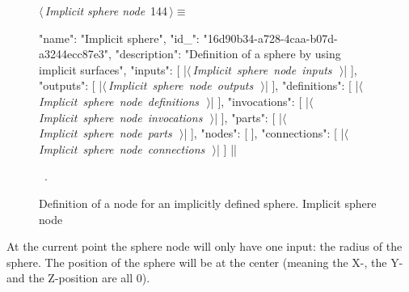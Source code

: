 \documentclass[%
    a4paper,    %
    justified,  %
    nobib,      %
    openany     %
]{tufte-book}
\makeatletter
\renewcommand{\label}[1]{\@tufte@label{##1}}%
\makeatother
\begin{document}
\begin{figure}[!htbp]
\begin{flushleft} \small
\begin{minipage}{\linewidth}\label{scrap98}\raggedright\small
{} $\langle\,${\itshape Implicit sphere node}\nobreak\ {\footnotesize {144}}$\,\rangle\equiv$
\vspace{-1ex}
\begin{pythoncode}
{
    "name": "Implicit sphere",
    "id_": "16d90b34-a728-4caa-b07d-a3244ecc87e3",
    "description": "Definition of a sphere by using implicit surfaces",
    "inputs": [
        |\hbox{$\langle\,${\itshape Implicit sphere node inputs}\nobreak\ {\footnotesize {}}$\,\rangle$}|
    ],
    "outputs": [
        |\hbox{$\langle\,${\itshape Implicit sphere node outputs}\nobreak\ {\footnotesize {}}$\,\rangle$}|
    ],
    "definitions": [
        |\hbox{$\langle\,${\itshape Implicit sphere node definitions}\nobreak\ {\footnotesize {}}$\,\rangle$}|
    ],
    "invocations": [
        |\hbox{$\langle\,${\itshape Implicit sphere node invocations}\nobreak\ {\footnotesize {}}$\,\rangle$}|
    ],
    "parts": [
        |\hbox{$\langle\,${\itshape Implicit sphere node parts}\nobreak\ {\footnotesize {}}$\,\rangle$}|
    ],
    "nodes": [
    ],
    "connections": [
        |\hbox{$\langle\,${\itshape Implicit sphere node connections}\nobreak\ {\footnotesize {}}$\,\rangle$}|
    ]
}|\NWsep|
\end{pythoncode}
\vspace{1.5ex}
\footnotesize
\begin{list}{}{\setlength{\itemsep}{-\parsep}\setlength{\itemindent}{-\leftmargin}}
\item \NWtxtMacroRefIn\ .

\item{}
\end{list}
\end{minipage}\vspace{4ex}
\end{flushleft}
\caption{Definition of a node for an implicitly defined sphere.
  \newline{}\newline{}Implicit sphere node}
\end{figure}

At the current point the sphere node will only have one input: the radius of
the sphere. The position of the sphere will be at the center (meaning the
X-, the Y- and the Z-position are all 0).
\end{document}
